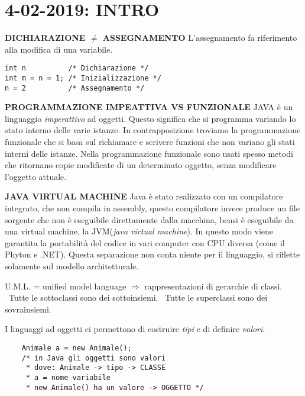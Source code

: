 

\newpage
\section{4-02-2019: INTRO}
\textbf{DICHIARAZIONE $\neq$ ASSEGNAMENTO} \newline
L'assegnamento fa riferimento alla modifica di una variabile.
\begin{lstlisting}
int n		   /* Dichiarazione */
int m = n = 1; /* Inizializzazione */
n = 2 		   /* Assegnamento */
\end{lstlisting}

\noindent \textbf{PROGRAMMAZIONE IMPEATTIVA VS FUNZIONALE} \newline
JAVA è un linguaggio \textit{imperattivo} ad oggetti. Questo significa che si programma variando lo stato interno delle varie istanze. In contrapposizione troviamo la programmazione funzionale che si basa sul richiamare e scrivere funzioni che non variano gli stati interni delle istanze. Nella programmazione funzionale sono usati spesso metodi che ritornano copie modificate di un determinato oggetto, senza modificare l'oggetto attuale.

\noindent \textbf{JAVA VIRTUAL MACHINE} \newline
\noindent Java è stato realizzato con un compilatore integrato, che non compila in assembly, questo compilatore invece produce un file sorgente che non è eseguibile direttamente dalla macchina, bensi è eseguibile da una virtual machine, la JVM(\textit{java virtual machine}). In questo modo viene garantita la portabilità del codice in vari computer con CPU diversa (come il Phyton e .NET). \newline
Questa separazione non conta niente per il linguaggio, si riflette solamente sul modello architetturale.

\noindent U.M.L. = unified model language $\Rightarrow$ rappresentazioni di gerarchie di classi. \newline
{} \newline
\textbullet\ Tutte le sottoclassi sono dei sottoinsiemi. \newline
\textbullet\ Tutte le superclassi sono dei sovrainsiemi. 

\noindent I linguaggi ad oggetti ci permettono di costruire \textit{tipi} e di definire \textit{valori}. 
\begin{lstlisting}
	Animale a = new Animale();
	/* in Java gli oggetti sono valori
	 * dove: Animale -> tipo -> CLASSE
	 * a = nome variabile
	 * new Animale() ha un valore -> OGGETTO */
\end{lstlisting}

